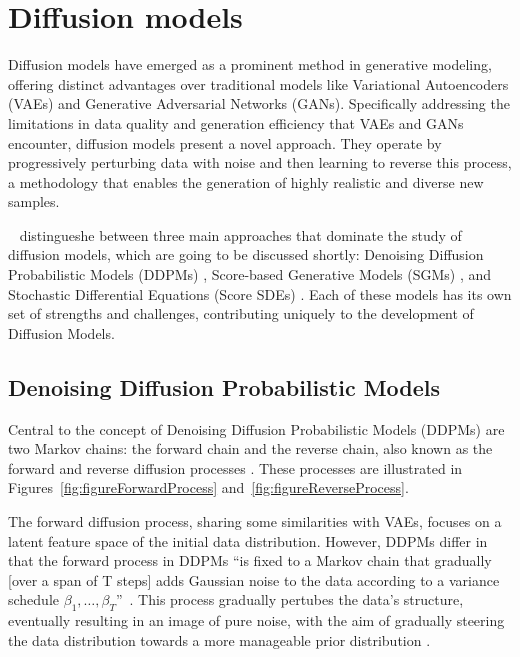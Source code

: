 \section{Diffusion models}\label{diffusion Models}

Diffusion models have emerged as a prominent method in generative modeling, offering distinct advantages over traditional models like Variational Autoencoders (VAEs) and Generative Adversarial Networks (GANs). Specifically addressing the limitations in data quality and generation efficiency that VAEs and GANs encounter, diffusion models present a novel approach. They operate by progressively perturbing data with noise and then learning to reverse this process, a methodology that enables the generation of highly realistic and diverse new samples.

~\cite{yangdiffusionSummary} distingueshe between three main approaches that dominate the study of diffusion models, which are going to be discussed shortly: Denoising Diffusion Probabilistic Models (DDPMs) \citep{hoDDPMs,sohlDDPM}, Score-based Generative Models (SGMs) \citep{song2019SGM}, and Stochastic Differential Equations (Score SDEs) \citep{song2020score, song2021maximum}. Each of these models has its own set of strengths and challenges, contributing uniquely to the development of Diffusion Models.

\subsection{Denoising Diffusion Probabilistic Models}

Central to the concept of Denoising Diffusion Probabilistic Models (DDPMs) are two Markov chains: the forward chain and the reverse chain, also known as the forward and reverse diffusion processes \citep{sohlDDPM}. These processes are illustrated in Figures~\ref{fig:figureForwardProcess} and~\ref{fig:figureReverseProcess}. 

The forward diffusion process, sharing some similarities with VAEs, focuses on a latent feature space of the initial data distribution. However, DDPMs differ in that the forward process in DDPMs ``is fixed to a Markov chain that gradually [over a span of T steps] adds Gaussian noise to the data according to a variance schedule \(\beta_1, \ldots, \beta_T \)''~\cite{hoDDPMs}. This process gradually pertubes the data's structure, eventually resulting in an image of pure noise, with the aim of gradually steering the data distribution towards a more manageable prior distribution \citep{yangdiffusionSummary, pooleDreamfusion}. 

